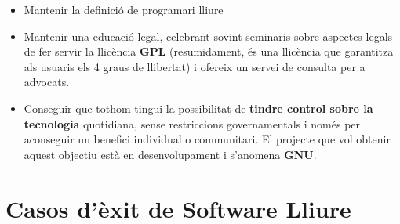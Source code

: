 	\begin{itemize}
	\item Mantenir la definició de programari lliure
	\item Mantenir una educació legal, celebrant sovint seminaris sobre aspectes legals de fer servir la 		llicència \textbf{GPL} (resumidament, és una llicència que garantitza als usuaris els 4 graus de 		llibertat) i ofereix un servei de consulta per a advocats.
	\item Conseguir que tothom tingui la possibilitat de \textbf{tindre control sobre la tecnologia} 		quotidiana, sense restriccions governamentals i només per aconseguir un benefici individual o 		communitari. El projecte que vol obtenir aquest objectiu està en desenvolupament i s'anomena 		\textbf{GNU}. \cite{ObjGNU} \cite{OrgDefFSF}
	\end{itemize}

\section{Casos d'èxit de Software Lliure}

